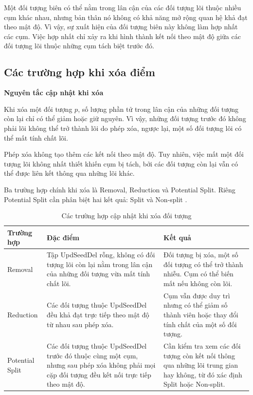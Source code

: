 Một đối tượng biên có thể nằm trong lân cận của các đối tượng lõi thuộc nhiều cụm khác nhau, nhưng bản thân nó không có khả năng mở rộng quan hệ khả đạt theo mật độ. Vì vậy, sự xuất hiện của đối tượng biên này không làm hợp nhất các cụm. Việc hợp nhất chỉ xảy ra khi hình thành kết nối theo mật độ giữa các đối tượng lõi thuộc những cụm tách biệt trước đó.

\subsection{Các trường hợp khi xóa điểm}

\textbf{Nguyên tắc cập nhật khi xóa}

Khi xóa một đối tượng \(p\), số lượng phần tử trong lân cận của những đối tượng còn lại chỉ có thể giảm hoặc giữ nguyên. Vì vậy, những đối tượng trước đó không phải lõi không thể trở thành lõi do phép xóa, ngược lại, một số đối tượng lõi có thể mất tính chất lõi.

Phép xóa không tạo thêm các kết nối theo mật độ. Tuy nhiên, việc mất một đối tượng lõi không nhất thiết khiến cụm bị tách, bởi các đối tượng còn lại vẫn có thể được liên kết thông qua những lõi khác.

Ba trường hợp chính khi xóa là Removal, Reduction và Potential Split. Riêng Potential Split cần phân biệt hai kết quả: Split và Non-split \parencite{ester1998incrementaldbscan}.

\begin{table}[H]
\centering
\caption{Các trường hợp cập nhật khi xóa đối tượng}
\label{tab:incremental_delete_cases}
\normalsize
\begin{tabularx}{\textwidth}{|P{2.8cm}|Y|Y|}\hline
\textbf{Trường hợp} & \textbf{Đặc điểm} & \textbf{Kết quả} \\\hline
Removal &
Tập UpdSeedDel rỗng, không có đối tượng lõi còn lại nằm trong lân cận của những đối tượng vừa mất tính chất lõi. &
Đối tượng bị xóa, một số đối tượng có thể trở thành nhiễu. Cụm có thể biến mất nếu không còn lõi.
\\\hline
Reduction &
Các đối tượng thuộc UpdSeedDel đều khả đạt trực tiếp theo mật độ từ nhau sau phép xóa. &
Cụm vẫn được duy trì nhưng có thể giảm số thành viên hoặc thay đổi tính chất của một số đối tượng. \\\hline
Potential Split &
Các đối tượng thuộc UpdSeedDel trước đó thuộc cùng một cụm, nhưng sau phép xóa không phải mọi cặp đối tượng đều kết nối trực tiếp theo mật độ. &
Cần kiểm tra xem các đối tượng còn kết nối thông qua những lõi trung gian hay không, từ đó xác định Split hoặc Non-split. \\\hline
\end{tabularx}
\end{table}

